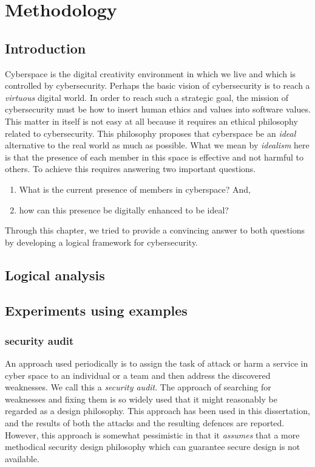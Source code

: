 \chapter{Methodology}
\section{Introduction}
Cyberspace is the digital creativity environment in which we live and which is controlled by cybersecurity.  Perhaps the basic vision of cybersecurity is to reach a \emph{virtuous} digital world.  In order to reach such a strategic goal, the mission of cybersecurity must be how to insert human ethics and values into software values.  This matter in itself is not easy at all because it requires an ethical philosophy related to cybersecurity.  This philosophy proposes that cyberspace be an \emph{ideal} alternative to the real world as much as possible.  What we mean by \emph{idealism} here is that the presence of each member in this space is effective and not harmful to others.  To achieve this requires answering two important questions.
\begin{enumerate}
\item What is the current presence of members in cyberspace? And,
\item how can this presence be digitally enhanced to be ideal?
\end{enumerate}
      Through this chapter, we tried to provide a convincing answer to both questions by developing a  logical framework for cybersecurity. %

\section{Logical analysis}

\section{Experiments using examples}
\iflonger
\subsection{security audit}
An approach used periodically is to assign the task of attack or harm   a service in cyber space  to an individual or a team and then address the discovered weaknesses. We call this a {\em security audit}. The approach of searching for weaknesses and fixing them is so widely used that it might reasonably be regarded as a design philosophy.
This approach has been used in this dissertation, and the results of
both the attacks and the resulting defences are reported.
However, this approach is somewhat pessimistic in that it {\em assumes}
that a more methodical security design philosophy which can guarantee
secure design is not available.
\fi

